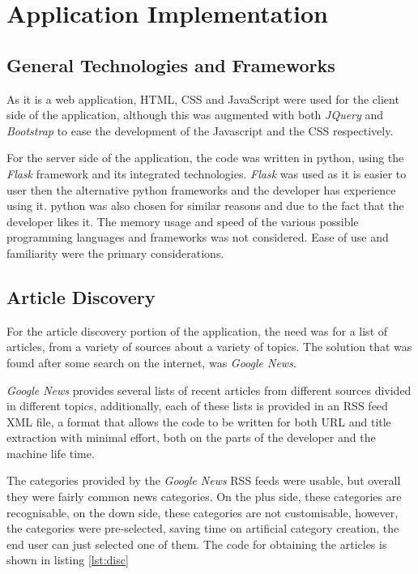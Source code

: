 \chapter{Application Implementation}

\section{General Technologies and Frameworks}

As it is a web application, HTML, CSS and JavaScript were used for the client side of the application, although this was augmented with both \textit{JQuery} and \textit{Bootstrap} to ease the development of the Javascript and the CSS respectively. 

For the server side of the application, the code was written in python, using the \textit{Flask} framework and its integrated technologies. \textit{Flask} was used as it is easier to user then the alternative python frameworks and the developer has experience using it. python was also chosen for similar reasons and due to the fact that the developer likes it. The memory usage and speed of the various possible programming languages and frameworks was not considered. Ease of use and familiarity were the primary considerations. 

\section{Article Discovery}

For the article discovery portion of the application, the need was for a list of articles, from a variety of sources about a variety of topics. The solution that was found after some search on the internet, was \textit{Google News}.

\textit{Google News} provides several lists of recent articles from different sources divided in different topics, additionally, each of these lists is provided in an RSS feed XML file, a format that allows the code to be written for both URL and title extraction with minimal effort, both on the parts of the developer and the machine life time.

The categories provided by the \textit{Google News} RSS feeds were usable, but overall they were fairly common news categories. On the plus side, these categories are recognisable, on the down side, these categories are not customisable, however, the categories were pre-selected, saving time on artificial category creation, the end user can just selected one of them. The code for obtaining the articles is shown in listing \ref{lst:disc}

